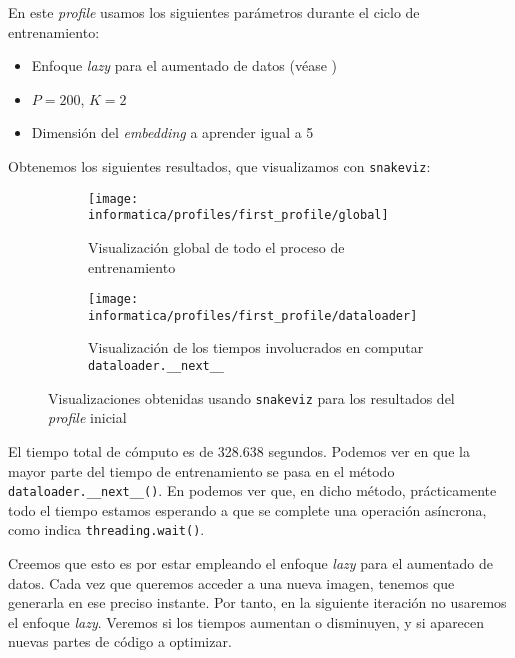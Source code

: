 En este \textit{profile} usamos los siguientes parámetros durante el ciclo de entrenamiento:

\begin{itemize}
    \item Enfoque \textit{lazy} para el aumentado de datos (véase )
    \item $P = 200$, $K = 2$
    \item Dimensión del \textit{embedding} a aprender igual a 5
\end{itemize}

Obtenemos los siguientes resultados, que visualizamos con \lstinline{snakeviz}:

\begin{figure}[H]
\centering
\ajustarsubcaptions

    \begin{subfigure}{.5\textwidth}
        \centering
        \texttt{[image: informatica/profiles/first\_profile/global]}
        \caption{Visualización global de todo el proceso de entrenamiento}
        \label{img:first_profile_global}
    \end{subfigure}%
    \begin{subfigure}{.5\textwidth}
        \centering
        \texttt{[image: informatica/profiles/first\_profile/dataloader]}
        \caption{Visualización de los tiempos involucrados en computar \lstinline{dataloader.__next__}}
        \label{img:first_profile_dataloader_next}
    \end{subfigure}
\caption{Visualizaciones obtenidas usando \lstinline{snakeviz} para los resultados del \textit{profile} inicial}
\end{figure}

El tiempo total de cómputo es de 328.638 segundos. Podemos ver en  que la mayor parte del tiempo de entrenamiento se pasa en el método \lstinline{dataloader.__next__()}. En  podemos ver que, en dicho método, prácticamente todo el tiempo estamos esperando a que se complete una operación asíncrona, como indica \lstinline{threading.wait()}.

Creemos que esto es por estar empleando el enfoque \textit{lazy} para el aumentado de datos. Cada vez que queremos acceder a una nueva imagen, tenemos que generarla en ese preciso instante. Por tanto, en la siguiente iteración no usaremos el enfoque \textit{lazy}. Veremos si los tiempos aumentan o disminuyen, y si aparecen nuevas partes de código a optimizar.

